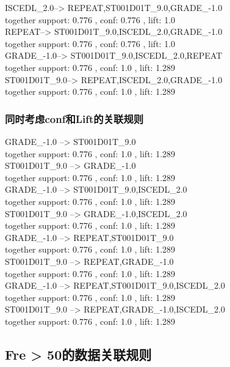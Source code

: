 \documentclass[12pt, a4paper, oneside]{ctexart}
\begin{document}
ISCEDL\_2.0--> REPEAT,ST001D01T\_9.0,GRADE\_-1.0\\
 together support: 0.776 , conf: 0.776 , lift: 1.0\\
REPEAT--> ST001D01T\_9.0,ISCEDL\_2.0,GRADE\_-1.0\\
 together support: 0.776 , conf: 0.776 , lift: 1.0\\
GRADE\_-1.0--> ST001D01T\_9.0,ISCEDL\_2.0,REPEAT\\
 together support: 0.776 , conf: 1.0 , lift: 1.289\\
ST001D01T\_9.0--> REPEAT,ISCEDL\_2.0,GRADE\_-1.0\\
 together support: 0.776 , conf: 1.0 , lift: 1.289\\

 \subsubsection{同时考虑conf和Lift的关联规则 } 
 GRADE\_-1.0 --> ST001D01T\_9.0 \\
together support: 0.776 , conf: 1.0 , lift: 1.289\\
ST001D01T\_9.0 --> GRADE\_-1.0 \\
together support: 0.776 , conf: 1.0 , lift: 1.289\\
GRADE\_-1.0 --> ST001D01T\_9.0,ISCEDL\_2.0 \\
together support: 0.776 , conf: 1.0 , lift: 1.289\\
ST001D01T\_9.0 --> GRADE\_-1.0,ISCEDL\_2.0 \\
together support: 0.776 , conf: 1.0 , lift: 1.289\\
GRADE\_-1.0 --> REPEAT,ST001D01T\_9.0 \\
together support: 0.776 , conf: 1.0 , lift: 1.289\\
ST001D01T\_9.0 --> REPEAT,GRADE\_-1.0 \\
together support: 0.776 , conf: 1.0 , lift: 1.289\\
GRADE\_-1.0 --> REPEAT,ST001D01T\_9.0,ISCEDL\_2.0 \\
together support: 0.776 , conf: 1.0 , lift: 1.289\\
ST001D01T\_9.0 --> REPEAT,GRADE\_-1.0,ISCEDL\_2.0 \\
together support: 0.776 , conf: 1.0 , lift: 1.289\\
\subsection{Fre > 50的数据关联规则}
\end{document}
